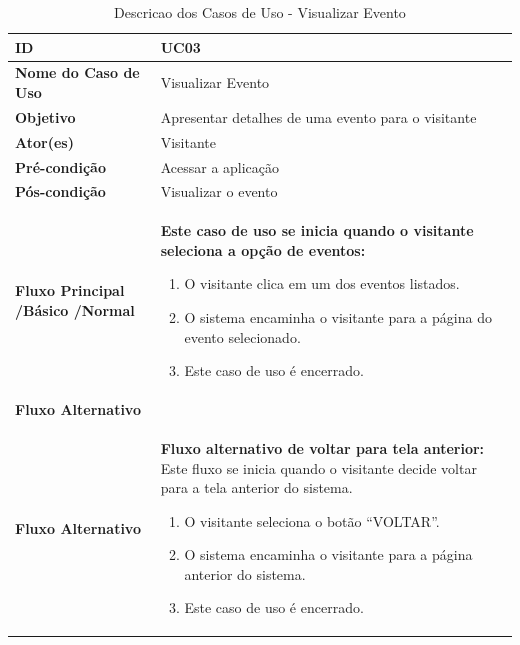 \begin{table}[t]
\begin{tabular}{| p{6cm} | p{10cm} |}
	\hline
	\textbf{ID} & UC03\tabularnewline
	\hline
	\hline
	\textbf{Nome do Caso de Uso} & Visualizar Evento\tabularnewline
	\hline
	\textbf{Objetivo} & Apresentar detalhes de uma evento para o visitante\tabularnewline
	\hline
	\textbf{Ator(es)} & Visitante\tabularnewline
	\hline
	\textbf{Pré-condição} & Acessar a aplicação\tabularnewline
	\hline
	\textbf{Pós-condição} & Visualizar o evento\tabularnewline
	\hline
	\textbf{Fluxo Principal /Básico /Normal} & \textbf{Este caso de uso se inicia quando o visitante seleciona a opção de eventos:}
	\vspace{0.2cm}
	\begin{enumerate}
		\item O visitante clica em um dos eventos listados.
		\item O sistema encaminha o visitante para a página do evento selecionado.
		\item Este caso de uso é encerrado.
	\end{enumerate} \tabularnewline
	\hline
	\textbf{Fluxo Alternativo} & \tabularnewline
	\hline
	\textbf{Fluxo Alternativo} & \textbf{Fluxo alternativo de voltar para tela anterior:}
	\vspace{0.2cm}
	Este fluxo se inicia quando o visitante decide voltar para a tela anterior do sistema.
	\begin{enumerate}
		\item O visitante seleciona o botão “VOLTAR”.
		\item O sistema encaminha o visitante para a página anterior do sistema.
		\item Este caso de uso é encerrado.
	\end{enumerate} \tabularnewline
	\hline
\end{tabular}
\caption{Descricao dos Casos de Uso - Visualizar Evento}
\label{DCU_Visualizar_Evento}
\end{table}

